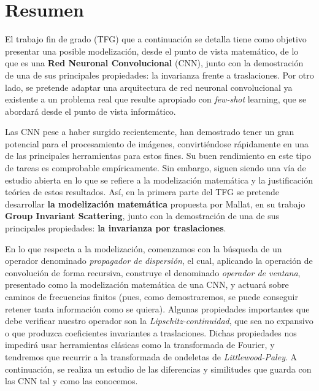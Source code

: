 %


\chapter{Resumen}

\noindent El trabajo fin de grado (TFG) que a continuación se detalla tiene como objetivo presentar una posible modelización, desde el punto de vista matemático, de lo que es una \textbf{Red Neuronal Convolucional} (CNN), junto con la demostración de una de sus principales propiedades: la invarianza frente a traslaciones. Por otro lado, se pretende adaptar una arquitectura de red neuronal convolucional ya existente a un problema real que resulte apropiado con \textit{few-shot} learning, que se abordará desde el punto de vista informático.

\medskip

\noindent Las CNN pese a haber surgido recientemente, han demostrado tener un gran potencial para el procesamiento de imágenes, convirtiéndose rápidamente en una de las principales herramientas para estos fines. Su buen rendimiento en este tipo de tareas es comprobable empíricamente. Sin embargo, siguen siendo una vía de estudio abierta en lo que se refiere a la modelización matemática y la justificación teórica de estos resultados. Así, en la primera parte del TFG se pretende desarrollar \textbf{la modelización matemática} propuesta por Mallat, en su trabajo \textbf{Group Invariant Scattering}, junto con la demostración de una de sus principales propiedades: \textbf{la invarianza por traslaciones}.

\medskip

\noindent En lo que respecta a la modelización, comenzamos con la búsqueda de un operador denominado \textit{propagador de dispersión}, el cual,  aplicando la operación de convolución de forma recursiva, construye el denominado \textit{operador de ventana}, presentado como la modelización matemática de una CNN, y actuará sobre caminos de frecuencias finitos (pues, como demostraremos, se puede conseguir retener tanta información como se quiera). Algunas propiedades importantes que debe verificar nuestro operador son la \textit{Lipschitz-continuidad}, que sea no expansivo o que produzca coeficientes invariantes a traslaciones. Dichas propiedades nos impedirá usar herramientas clásicas como la transformada de Fourier, y tendremos que recurrir a la transformada de ondeletas de \textit{Littlewood-Paley}. A continuación, se realiza un estudio de las diferencias y similitudes que guarda con las CNN tal y como las conocemos.

